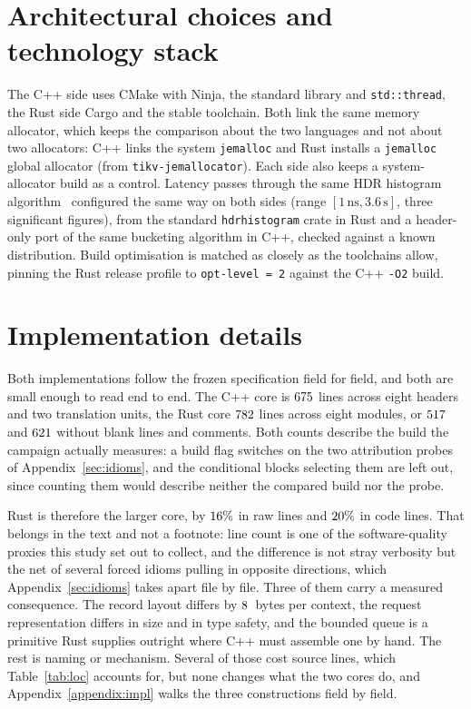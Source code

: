 \documentclass[english,oneside,a4paper,censored,csm,software-track-2020]{HYthesisML}
\begin{document}
\begin{appendices}
\section{Architectural choices and technology stack}
The C++ side uses CMake with Ninja, the standard library and \texttt{std::thread}, the Rust side
Cargo and the stable toolchain. Both link the same memory allocator, which keeps the comparison
about the two languages and not about two allocators: C++ links the system \texttt{jemalloc} and
Rust installs a \texttt{jemalloc} global allocator (from \texttt{tikv-jemallocator}). Each side
also keeps a system-allocator build as a control. Latency passes through the same HDR histogram
algorithm~\cite{tene_hdrhistogram} configured the same way on both sides (range
$[1\,\text{ns}, 3.6\,\text{s}]$, three significant figures), from the standard
\texttt{hdrhistogram} crate in Rust and a header-only port of the same bucketing algorithm in
C++, checked against a known distribution. Build optimisation is matched as closely as the
toolchains allow, pinning the Rust release profile to \texttt{opt-level~=~2} against the C++
\texttt{-O2} build.

\section{Implementation details}\label{sec:impldetails}
\label{sec:impl}
Both implementations follow the frozen specification field for field, and both are small enough to
read end to end. The C++ core is $675$ lines across eight headers and two translation
units, the Rust core $782$ lines across eight modules, or $517$ and $621$
without blank lines and comments. Both counts describe the build the campaign actually measures:
a build flag switches on the two attribution probes of Appendix~\ref{sec:idioms}, and the
conditional blocks selecting them are left out, since counting them would describe neither the
compared build nor the probe.

Rust is therefore the larger core, by $16\%$ in raw lines and $20\%$ in code lines.
That belongs in the text and not a footnote: line count is one of the software-quality proxies
this study set out to collect, and the difference is not stray verbosity but the net of several
forced idioms pulling in opposite directions, which Appendix~\ref{sec:idioms} takes apart file by
file. Three of them carry a measured consequence. The record layout differs by
$8$~bytes per context, the request representation differs in size and in type
safety, and the bounded queue is a primitive Rust supplies outright where C++ must assemble one
by hand. The rest is naming or mechanism. Several of those cost source lines, which
Table~\ref{tab:loc} accounts for, but none changes what the two cores do, and
Appendix~\ref{appendix:impl} walks the three constructions field by field.


\end{appendices}
\end{document}
